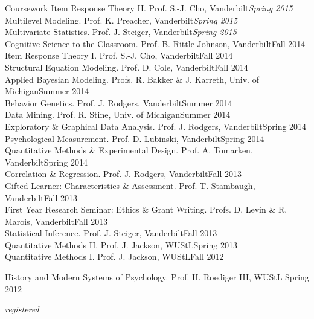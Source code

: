 \documentclass {resume}
\begin{document}
\begin{rSection}{\textrm{Coursework}}
Item Response Theory \textrm{II}. Prof. S.-J. Cho, Vanderbilt\hfill  {\textit{Spring 2015}}\smallskip\\
Multilevel Modeling. Prof. K. Preacher, Vanderbilt\hfill  {\textit{Spring 2015}}\smallskip\\
Multivariate Statistics. Prof. J. Steiger, Vanderbilt\hfill  {\textit{Spring 2015}}\smallskip\\
Cognitive Science to the Classroom. Prof. B. Rittle-Johnson, Vanderbilt\hfill  {Fall 2014}\smallskip\\
Item Response Theory \textrm{I}. Prof. S.-J. Cho, Vanderbilt\hfill  {Fall 2014}\smallskip\\
Structural Equation Modeling. Prof. D. Cole, Vanderbilt\hfill  {Fall 2014}\smallskip\\%
Applied Bayesian Modeling. Profs. R. Bakker \& J. Karreth, Univ. of Michigan\hfill  {Summer 2014}\smallskip\\
Behavior Genetics. Prof. J. Rodgers, Vanderbilt\hfill  {Summer 2014}\smallskip\\
Data Mining. Prof. R. Stine, Univ. of Michigan\hfill  {Summer 2014}\smallskip\\
Exploratory \& Graphical Data Analysis. Prof. J. Rodgers, Vanderbilt\hfill  {Spring 2014}\smallskip\\
Psychological Measurement. Prof. D. Lubinski, Vanderbilt\hfill  {Spring 2014}\smallskip\\
Quantitative Methods \& Experimental Design. Prof. A. Tomarken, Vanderbilt\hfill  {Spring 2014}\smallskip\\
Correlation \& Regression. Prof. J. Rodgers, Vanderbilt\hfill  {Fall 2013}\smallskip\\
Gifted Learner: Characteristics \& Assessment. Prof. T. Stambaugh, Vanderbilt\hfill  {Fall 2013}\smallskip\\
First Year Research Seminar: Ethics \& Grant Writing. Profs. D. Levin \& R. Marois, Vanderbilt\hfill  {Fall 2013}\smallskip\\
Statistical Inference. Prof. J. Steiger, Vanderbilt\hfill  {Fall 2013}\smallskip\\
Quantitative Methods \textrm{II}. Prof. J. Jackson, WUStL\hfill  {Spring 2013}\smallskip\\
Quantitative Methods \textrm{I}. Prof. J. Jackson, WUStL\hfill  {Fall 2012}\smallskip\\
\begin{samepage}History and Modern Systems of Psychology. Prof. H. Roediger \textrm{III}, WUStL \hfill  {Spring 2012}\vspace{-2mm}\begin{center}\footnotesize{ %
\textit{registered}
}\end{center} \vspace{-4mm}\end{samepage}
\end{rSection}
\end{document}
